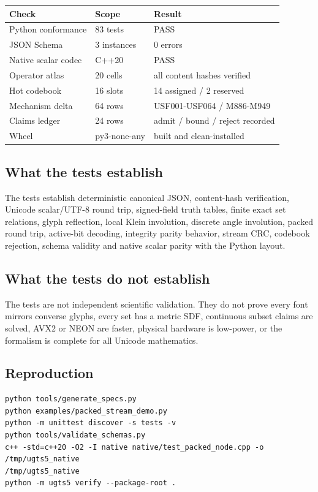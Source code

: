 \documentclass[11pt,a4paper]{article}
\begin{document}
\begin{tabularx}{\textwidth}{P{48mm}P{42mm}Y}
\toprule
\textbf{Check} & \textbf{Scope} & \textbf{Result}\\
\midrule
Python conformance & 83 tests & PASS \\
JSON Schema & 3 instances & 0 errors \\
Native scalar codec & C++20 & PASS \\
Operator atlas & 20 cells & all content hashes verified \\
Hot codebook & 16 slots & 14 assigned / 2 reserved \\
Mechanism delta & 64 rows & USF001-USF064 / M886-M949 \\
Claims ledger & 24 rows & admit / bound / reject recorded \\
Wheel & py3-none-any & built and clean-installed \\
\bottomrule
\end{tabularx}

\subsection{What the tests establish}
The tests establish deterministic canonical JSON, content-hash verification, Unicode scalar/UTF-8 round trip, signed-field truth tables, finite exact set relations, glyph reflection, local Klein involution, discrete angle involution, packed round trip, active-bit decoding, integrity parity behavior, stream CRC, codebook rejection, schema validity and native scalar parity with the Python layout.

\subsection{What the tests do not establish}
The tests are not independent scientific validation. They do not prove every font mirrors converse glyphs, every set has a metric SDF, continuous subset claims are solved, AVX2 or NEON are faster, physical hardware is low-power, or the formalism is complete for all Unicode mathematics.

\subsection{Reproduction}
\begin{Verbatim}[fontsize=\small,frame=single]
python tools/generate_specs.py
python examples/packed_stream_demo.py
python -m unittest discover -s tests -v
python tools/validate_schemas.py
c++ -std=c++20 -O2 -I native native/test_packed_node.cpp -o /tmp/ugts5_native
/tmp/ugts5_native
python -m ugts5 verify --package-root .
\end{Verbatim}
\end{document}
